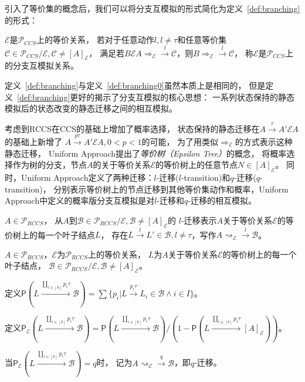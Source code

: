       引入了等价集的概念后，我们可以将分支互模拟的形式简化为定义~\ref{def:branching}的形式：
   \begin{definition}\label{def:branching}
      $\mathcal{E}$是$\mathcal{P}_{CCS}$上的等价关系，
      若对于任意动作$l,l\neq \tau$和任意等价集$\mathcal{C}\in \mathcal{P}_{CCS}/\mathcal{E}, \mathcal{C}\neq [A]_{\mathcal{E}}$，
      满足若$B\mathcal{E}A\Rightarrow_{\mathcal{E}}\stackrel{l}{\rightarrow}\mathcal{C}$，则$B\Rightarrow_{\mathcal{E}}\stackrel{l}{\rightarrow}\mathcal{C}$，
      称$\mathcal{E}$是$\mathcal{P}_{CCS}$上的分支互模拟关系。
   \end{definition}
   定义~\ref{def:branching}与定义~\ref{def:branching0}虽然本质上是相同的，
   但是定义~\ref{def:branching}更好的揭示了分支互模拟的核心思想：
   一系列状态保持的静态模拟后的状态改变的静态迁移之间的相互模拟。

   考虑到RCCS在CCS的基础上增加了概率选择，
   状态保持的静态迁移在$A\stackrel{\tau}{\rightarrow}A'\mathcal{E}A$的基础上新增了
   $A\stackrel{p\tau}{\rightarrow} A'\mathcal{E}A,0<p<1$的可能，
   为了用类似$\Rightarrow_{\mathcal{E}}$的方式表示这种静态迁移，
   Uniform Approach提出了\textit{等价树（Epsilon Tree）}的概念\cite{Fu_UniformApproach}，
   将概率选择作为树的分支，节点$A$的关于等价关系$\mathcal{E}$的等价树上的任意节点$N\in [A]_{\mathcal{E}}$。
   同时，Uniform Approach定义了两种迁移：$l$-迁移($l$-transition)和$q$-迁移($q$-transition)，
   分别表示等价树上的节点迁移到其他等价集动作和概率，Uniform Approach中定义的概率版分支互模拟是对$l$-迁移和$q$-迁移的相互模拟。

   \begin{definition}[$l$-迁移($l$-transition)]
      $A\in \mathcal{P}_{RCCS}$，
      从$A$到$\mathcal{B}\in \mathcal{P}_{RCCS}/\mathcal{E},\mathcal{B}\neq [A]_{\mathcal{E}}$的
      $l$-迁移表示$A$关于等价关系$\mathcal{E}$的等价树上的每一个叶子结点$L$，
      存在$L\stackrel{l}{\rightarrow}L'\in\mathcal{B},l\neq \tau$，写作$A\rightsquigarrow_{\mathcal{E}}\stackrel{l}{\rightarrow}\mathcal{B}$。
   \end{definition}

   \begin{definition}[$q$-迁移($q$-transition)]
      $A\in \mathcal{P}_{RCCS}$，$\mathcal{E}$为$\mathcal{P}_{RCCS}$上的等价关系，
      $L$为$A$关于等价关系$\mathcal{E}$的等价树上的每一个叶子结点，
      $\mathcal{B}\in \mathcal{P}_{RCCS}/\mathcal{E}, \mathcal{B}\neq [A]_{\mathcal{E}}$。

      定义$\mathsf{P}(L\stackrel{\coprod_{i\in[k]}p_i\tau}{\longrightarrow}\mathcal{B})=\sum \{p_i|L\stackrel{p_i\tau}{\longrightarrow}L_i\in \mathcal{B}\wedge i\in I\}$。
      
      定义$\mathsf{P}_{\mathcal{E}}(L\stackrel{\coprod_{i\in[k]}p_i\tau}{\longrightarrow}\mathcal{B})=\mathsf{P}(L\stackrel{\coprod_{i\in[k]}p_i\tau}{\longrightarrow}\mathcal{B})/(1-\mathsf{P}(L\stackrel{\coprod_{i\in[k]}p_i\tau}{\longrightarrow}[A]_{\mathcal{E}}))$。

      当$\mathsf{P}_{\mathcal{E}}(L\stackrel{\coprod_{i\in[k]}p_i\tau}{\longrightarrow}\mathcal{B})=q$时，
      记为$A\rightsquigarrow_{\mathcal{E}}\stackrel{q}{\rightarrow}\mathcal{B}$，即$q$-迁移。
   \end{definition}

